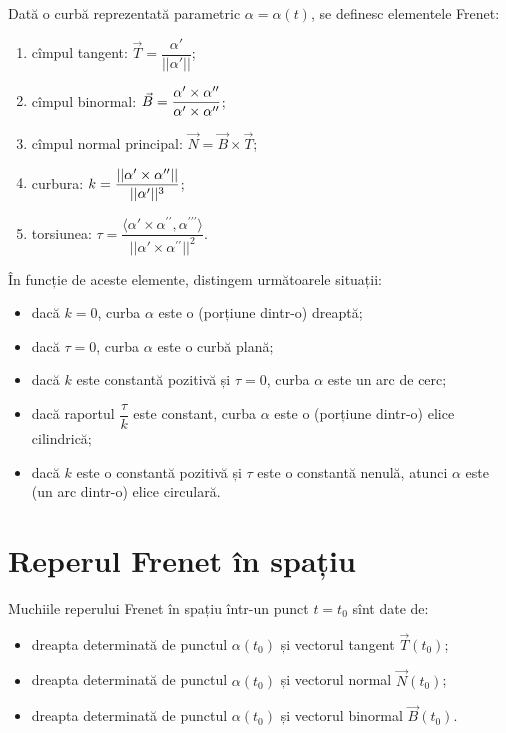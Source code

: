 Dată o curbă reprezentată parametric $ \alpha = \alpha(t) $, se definesc
elementele Frenet:
\begin{enumerate}[(1)]
  \item cîmpul tangent: $ \vec{T} = \dfrac{\alpha'}{||\alpha'||} $;
  \item cîmpul binormal: $ \vec{B} = \dfrac{\alpha' \times \alpha^{\prime\prime}}{%
    \alpha' \times \alpha^{\prime\prime}} $;
  \item cîmpul normal principal: $ \vec{N} = \vec{B} \times \vec{T} $;
  \item curbura: $ k = \dfrac{||\alpha' \times \alpha^{\prime\prime}||}{%
    ||\alpha'||^3} $;
  \item torsiunea: $ \tau = \dfrac{\langle \alpha' \times \alpha^{\prime\prime}, %
    \alpha^{\prime\prime\prime} \rangle}{||\alpha' \times \alpha^{\prime\prime}||^2} $.
\end{enumerate}

În funcție de aceste elemente, distingem următoarele situații:
\begin{itemize}
  \item dacă $ k = 0 $, curba $ \alpha $ este o (porțiune dintr-o) dreaptă;
  \item dacă $ \tau = 0 $, curba $ \alpha $ este o curbă plană;
  \item dacă $ k $ este constantă pozitivă și $ \tau = 0 $, curba $ \alpha $
    este un arc de cerc;
  \item dacă raportul $ \dfrac{\tau}{k} $ este constant, curba $ \alpha $ este
    o (porțiune dintr-o) elice cilindrică;
  \item dacă $ k $ este o constantă pozitivă și $ \tau $ este o constantă nenulă,
    atunci $ \alpha $ este (un arc dintr-o) elice circulară.
\end{itemize}



\section{Reperul Frenet în spațiu}

Muchiile reperului Frenet în spațiu într-un punct $ t = t_0 $ sînt date de:
\begin{itemize}
  \item dreapta determinată de punctul $ \alpha(t_0) $ și vectorul tangent $ \vec{T}(t_0) $;
  \item dreapta determinată de punctul $ \alpha(t_0) $ și vectorul normal $ \vec{N}(t_0) $;
  \item dreapta determinată de punctul $ \alpha(t_0) $ și vectorul binormal $ \vec{B}(t_0) $.
\end{itemize}

